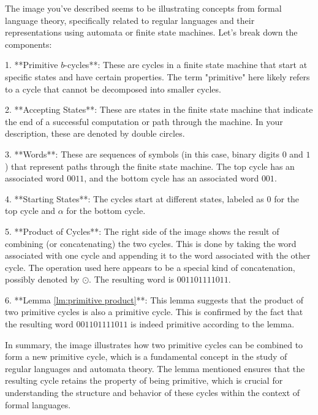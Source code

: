 The image you've described seems to be illustrating concepts from formal language theory, specifically related to regular languages and their representations using automata or finite state machines. Let's break down the components:

1. **Primitive \( b \)-cycles**: These are cycles in a finite state machine that start at specific states and have certain properties. The term "primitive" here likely refers to a cycle that cannot be decomposed into smaller cycles.

2. **Accepting States**: These are states in the finite state machine that indicate the end of a successful computation or path through the machine. In your description, these are denoted by double circles.

3. **Words**: These are sequences of symbols (in this case, binary digits \(0\) and \(1\)) that represent paths through the finite state machine. The top cycle has an associated word \(0011\), and the bottom cycle has an associated word \(001\).

4. **Starting States**: The cycles start at different states, labeled as \(0\) for the top cycle and \(\alpha\) for the bottom cycle.

5. **Product of Cycles**: The right side of the image shows the result of combining (or concatenating) the two cycles. This is done by taking the word associated with one cycle and appending it to the word associated with the other cycle. The operation used here appears to be a special kind of concatenation, possibly denoted by \(\odot\). The resulting word is \(001101111011\).

6. **Lemma \ref{lm:primitive product}**: This lemma suggests that the product of two primitive cycles is also a primitive cycle. This is confirmed by the fact that the resulting word \(001101111011\) is indeed primitive according to the lemma.

In summary, the image illustrates how two primitive cycles can be combined to form a new primitive cycle, which is a fundamental concept in the study of regular languages and automata theory. The lemma mentioned ensures that the resulting cycle retains the property of being primitive, which is crucial for understanding the structure and behavior of these cycles within the context of formal languages.